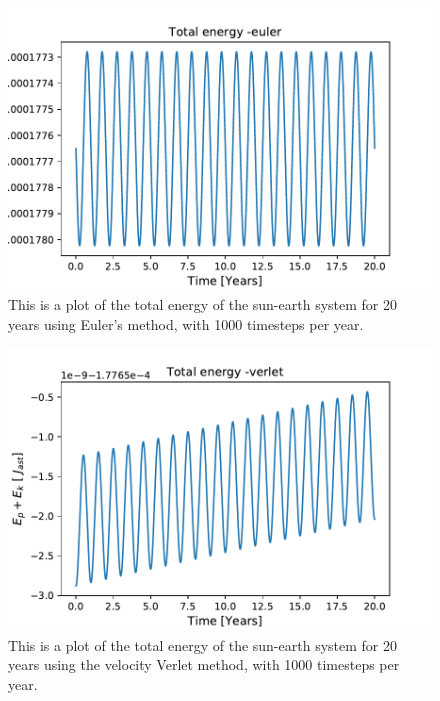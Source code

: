 \begin{figure}[H]
\includegraphics[width=0.9\linewidth]{../results/plots/totalenergy-euler.pdf}\caption{This is a plot of the total energy of the sun-earth system for 20 years using Euler's method, with 1000 timesteps per year.}\label{fig:totalenergy-euler}
\end{figure}	

\begin{figure}[H]
\includegraphics[width=0.9\linewidth]{../results/plots/totalenergy-verlet.pdf}\caption{This is a plot of the total energy of the sun-earth system for 20 years using the velocity Verlet method, with 1000 timesteps per year.}\label{fig:totalenergy-verlet}
\end{figure}

